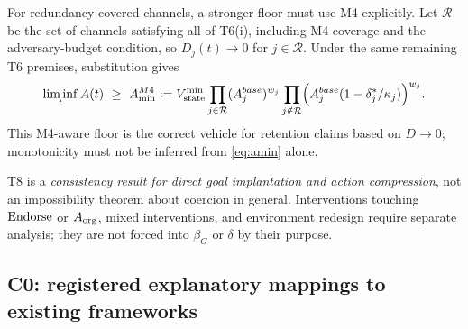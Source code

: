 For redundancy-covered channels, a stronger floor must use M4 explicitly.
Let $\mathcal R$ be the set of channels satisfying all of T6(i), including
M4 coverage and the adversary-budget condition, so $D_j(t)\to0$ for
$j\in\mathcal R$. Under the same remaining T6 premises, substitution gives
\begin{equation}\label{eq:amin-m4}
\liminf_t A(t)\ \ge\ A_{\min}^{M4}:=V_{\mathrm{state}}^{\min}
\prod_{j\in\mathcal R}(A_j^{base})^{w_j}
\prod_{j\notin\mathcal R}
\Bigl(A_j^{base}(1-\delta^{*}_j/\kappa_j)\Bigr)^{w_j}.
\end{equation}
This M4-aware floor is the correct vehicle for retention claims based on
$D\to0$; monotonicity must not be inferred from \eqref{eq:amin} alone.

T8 is a \emph{consistency result for direct goal implantation and action
compression}, not an impossibility theorem about coercion in general.
Interventions touching $\mathrm{Endorse}$ or $A_{\mathrm{org}}$, mixed interventions, and
environment redesign require separate analysis; they are not forced into
$\beta_G$ or $\delta$ by their purpose.

\subsection{C0: registered explanatory mappings to existing frameworks}
\label{sec:c0}

